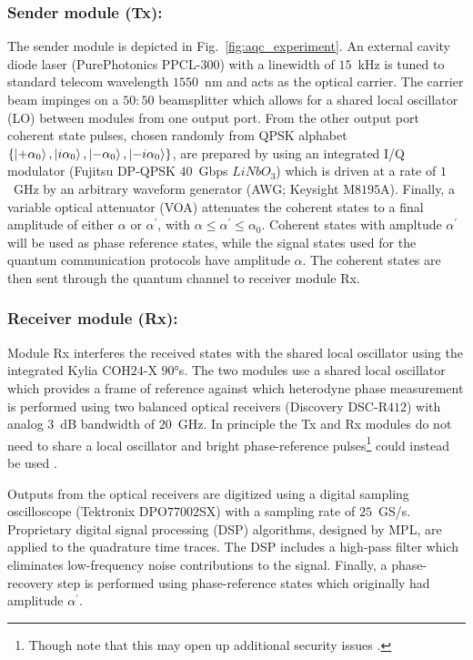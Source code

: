 \subsubsection{Sender module (Tx):} The sender module is depicted in Fig.~\ref{fig:aqc_experiment}. An external cavity diode laser (PurePhotonics PPCL-$300$) with a linewidth of $15$~kHz is tuned to standard telecom wavelength $1550$~nm and acts as the optical carrier. The carrier beam impinges on a $50:50$ beamsplitter which allows for a shared local oscillator (LO) between modules from one output port. From the other output port  coherent state pulses, chosen randomly from QPSK alphabet $\left\{ \ket{+ \alpha_0}, \ket{i \alpha_0}, \ket{-\alpha_0}, \ket{-i \alpha_0}\right\}$, are prepared by using an integrated I/Q modulator (Fujitsu DP-QPSK $40$~Gbps $LiNbO_3$) which is driven at a rate of $1$~GHz by an arbitrary waveform generator (AWG; Keysight M$8195$A). Finally, a variable optical attenuator (VOA) attenuates the coherent states to a final amplitude of either $\alpha$ or $\alpha^\prime$, with $\alpha \le \alpha^\prime \le \alpha_0$. Coherent states with ampltude $\alpha^\prime$ will be used as phase reference states, while the signal states used for the quantum communication protocols have amplitude $\alpha$. The coherent states are then sent through the quantum channel to receiver module Rx.

\subsubsection{Receiver module (Rx):}
Module Rx interferes the received states with the shared local oscillator using the integrated Kylia COH$24$-X $90\si{\degree}$s. The two modules use a shared local oscillator which provides a frame of reference against which heterodyne phase measurement is performed using two balanced optical receivers (Discovery DSC-R$412$) with analog $3$~dB bandwidth of $20$~GHz. In principle the Tx and Rx modules do not need to share a local oscillator and bright phase-reference pulses\footnote{Though note that this may open up additional security issues \cite{Ren2019}.} could instead be used \cite{Huang2015}.

Outputs from the optical receivers are digitized using a digital sampling oscilloscope (Tektronix DPO$77002$SX) with a sampling rate of $25$~GS/s. Proprietary digital signal processing (DSP) algorithms, designed by MPL, are applied to the quadrature time traces. The DSP includes a high-pass filter which eliminates low-frequency noise contributions to the signal. Finally, a phase-recovery step is performed using phase-reference states which originally had amplitude $\alpha^\prime$. %

